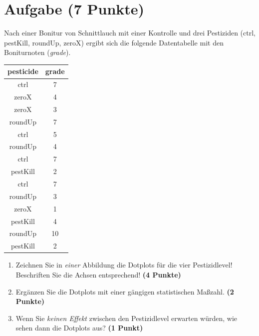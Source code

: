 \documentclass[a4paper, 10pt]{scrartcl}\usepackage[]{graphicx}\usepackage[]{color}
\begin{document}
\vspace{1cm}
 




 
\clearpage

\section{Aufgabe \hfill (7 Punkte)}

Nach einer Bonitur von Schnittlauch mit einer Kontrolle und drei Pestiziden (ctrl, pestKill, roundUp, zeroX) ergibt sich die folgende Datentabelle mit den Boniturnoten (\textit{grade}). 

\begin{table}[!h]
\centering
\begin{tabular}{cc}
\toprule
pesticide & grade\\
\midrule
ctrl & 7\\
zeroX & 4\\
zeroX & 3\\
roundUp & 7\\
ctrl & 5\\
\addlinespace
roundUp & 4\\
ctrl & 7\\
pestKill & 2\\
ctrl & 7\\
roundUp & 3\\
\addlinespace
zeroX & 1\\
pestKill & 4\\
roundUp & 10\\
pestKill & 2\\
\bottomrule
\end{tabular}
\end{table}



\begin{enumerate}
\item Zeichnen Sie in \textit{einer} Abbildung die Dotplots f{\"u}r die
  vier Pestizidlevel! Beschriften Sie die Achsen entsprechend!
  \textbf{(4 Punkte)}
\item Erg{\"a}nzen Sie die Dotplots mit einer g{\"a}ngigen
  statistischen Ma{\ss}zahl. \textbf{(2 Punkte)}
\item Wenn Sie \textit{keinen Effekt} zwischen den Pestizidlevel erwarten
  w{\"u}rden, wie sehen dann die Dotplots aus? \textbf{(1 Punkt)}
\end{enumerate} 
\clearpage
\end{document}

